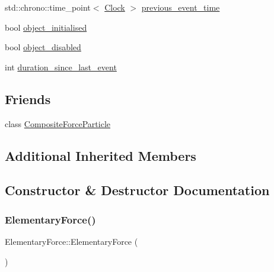 \begin{DoxyCompactItemize}
\item 
std\+::chrono\+::time\+\_\+point$<$ \mbox{\hyperlink{universe_8h_a0ef8d951d1ca5ab3cfaf7ab4c7a6fd80}{Clock}} $>$ \mbox{\hyperlink{classElementaryForce_ae61e8203d30c535260a473b0044e0070}{previous\+\_\+event\+\_\+time}}
\item 
bool \mbox{\hyperlink{classElementaryForce_ac5002305be13d4105a2c4a4ba79e2e49}{object\+\_\+initialised}}
\item 
bool \mbox{\hyperlink{classElementaryForce_a9854fb3352e6a66145dc1670026126b3}{object\+\_\+disabled}}
\item 
int \mbox{\hyperlink{classElementaryForce_a3d1e76c3faf50f2150df66b90c61b2f5}{duration\+\_\+since\+\_\+last\+\_\+event}}
\end{DoxyCompactItemize}
\subsection*{Friends}
\begin{DoxyCompactItemize}
\item 
class \mbox{\hyperlink{classElementaryForce_a9bc6eb2a4c20ce83728a7c9a31b91f19}{Composite\+Force\+Particle}}
\end{DoxyCompactItemize}
\subsection*{Additional Inherited Members}


\subsection{Constructor \& Destructor Documentation}
\mbox{\label{classElementaryForce_a1da5b85cdf3b79f3506dbdc4d877155a}} 
\subsubsection{\texorpdfstring{Elementary\+Force()}{ElementaryForce()}\hspace{0.1cm}{\footnotesize\ttfamily [1/4]}}
{\footnotesize\ttfamily Elementary\+Force\+::\+Elementary\+Force (\begin{DoxyParamCaption}{ }\end{DoxyParamCaption})\hspace{0.3cm}{\ttfamily [inline]}}

